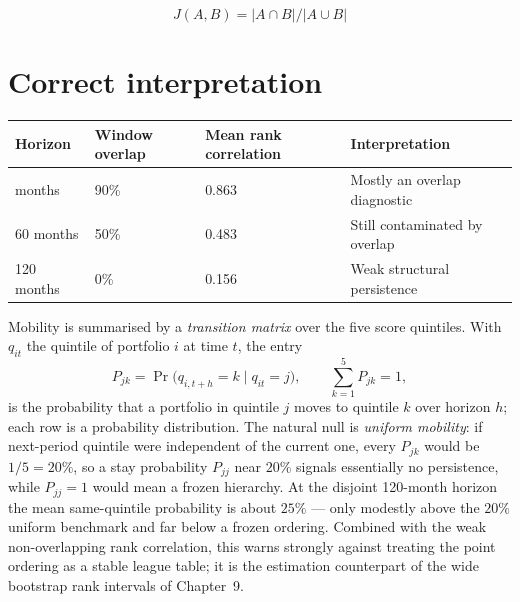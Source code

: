 \begin{equation}
J(A,B) = |A \cap  B| / |A \cup  B|
\end{equation}

\hypertarget{correct-interpretation}{%
\section{Correct interpretation}\label{correct-interpretation}}

\begin{longtable}[]{@{}p{}p{}p{}p{}@{}}
\toprule\noalign{}
Horizon & Window overlap & Mean rank correlation & Interpretation \\
\midrule\noalign{}
\endhead
\bottomrule\noalign{}
\endlastfoot
12 months & 90\% & 0.863 & Mostly an overlap diagnostic \\
60 months & 50\% & 0.483 & Still contaminated by overlap \\
120 months & 0\% & 0.156 & Weak structural persistence \\
\end{longtable}

Mobility is summarised by a \emph{transition matrix} over the five score
quintiles. With $q_{it}$ the quintile of portfolio $i$ at time $t$, the
entry
\begin{equation}\label{eq:ch10-transition}
P_{jk} = \Pr\bigl(q_{i,t+h}=k \mid q_{it}=j\bigr),
\qquad \sum_{k=1}^{5} P_{jk}=1,
\end{equation}
is the probability that a portfolio in quintile $j$ moves to quintile $k$
over horizon $h$; each row is a probability distribution. The natural
null is \emph{uniform mobility}: if next-period quintile were independent
of the current one, every $P_{jk}$ would be $1/5=20\%$, so a stay
probability $P_{jj}$ near $20\%$ signals essentially no persistence, while
$P_{jj}=1$ would mean a frozen hierarchy. At the disjoint 120-month
horizon the mean same-quintile probability is about $25\%$ --- only
modestly above the $20\%$ uniform benchmark and far below a frozen
ordering. Combined with the weak non-overlapping rank correlation, this
warns strongly against treating the point ordering as a stable league
table; it is the estimation counterpart of the wide bootstrap rank
intervals of Chapter~9.

